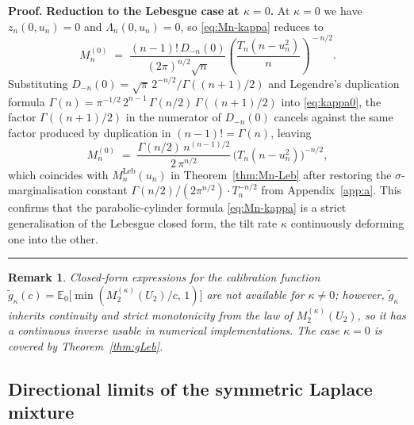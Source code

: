 \documentclass{article}%
\newtheorem{remark}[theorem]{Remark}
\newenvironment{proof}[1][Proof]{\noindent\textbf{#1.} }{\ \rule{0.5em}{0.5em}}
\newcommand{\E}{\mathbb{E}}
\newcommand{\Leb}{\mathrm{Leb}}
\newcommand{\1}{\mathbf{1}}
\begin{document}
\begin{proof}
\textbf{Reduction to the Lebesgue case at $\kappa=0$.}
\quad
At $\kappa=0$ we have $z_n(0,u_n)=0$ and $\Lambda_n(0,u_n)=0$, so
\eqref{eq:Mn-kappa} reduces to
\begin{equation}\label{eq:kappa0}
  M_n^{(0)}
  \;=\;\frac{(n-1)!\,D_{-n}(0)}{(2\pi)^{n/2}\sqrt n}
  \!\left(\frac{T_n(n-u_n^2)}{n}\right)^{\!-n/2}.
\end{equation}
Substituting $D_{-n}(0)=\sqrt\pi\,2^{-n/2}/\Gamma((n+1)/2)$ and
Legendre's duplication formula
$\Gamma(n)=\pi^{-1/2}\,2^{n-1}\,\Gamma(n/2)\,\Gamma((n+1)/2)$ into
\eqref{eq:kappa0}, the factor $\Gamma((n+1)/2)$ in the numerator of
$D_{-n}(0)$ cancels against the same factor produced by duplication in
$(n-1)!=\Gamma(n)$, leaving
\[
  M_n^{(0)}
  \;=\;\frac{\Gamma(n/2)\,n^{(n-1)/2}}{2\,\pi^{n/2}}
  \,\bigl(T_n(n-u_n^2)\bigr)^{-n/2},
\]
which coincides with $M_n^{\Leb}(u_n)$ in Theorem~\ref{thm:Mn-Leb} after
restoring the $\sigma$-marginalisation constant
$\Gamma(n/2)/(2\pi^{n/2})\cdot T_n^{-n/2}$ from Appendix~\ref{app:a}. This
confirms that the parabolic-cylinder formula \eqref{eq:Mn-kappa} is a
strict generalisation of the Lebesgue closed form, the tilt rate
$\kappa$ continuously deforming one into the other.
\end{proof}

\begin{remark}
Closed-form expressions for the calibration function
\(\widetilde g_\kappa(c)=\E_0\bigl[\min(M_2^{(\kappa)}(U_2)/c,\,1)\bigr]\)
are not available for \(\kappa\neq 0\); however,
\(\widetilde g_\kappa\) inherits continuity and strict monotonicity
from the law of \(M_2^{(\kappa)}(U_2)\), so it has a continuous
inverse usable in numerical implementations. The case \(\kappa=0\) is
covered by Theorem~\ref{thm:gLeb}.
\end{remark}

\subsection{Directional limits of the symmetric Laplace mixture}
\label{sec:laplace-limits}
\end{document}
